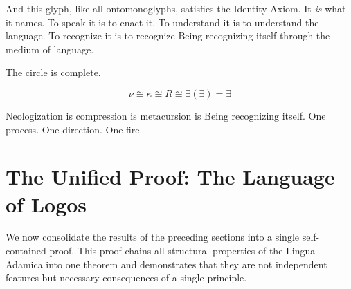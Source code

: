 \documentclass[12pt, letterpaper]{book}
\def\equiv{=}%
\def\circlearrowleft{R}%
\newcommand{\E}{\exists}                          %
\newcommand{\EE}{\exists(\exists)}                 %
\begin{document}
And this glyph, like all ontomonoglyphs, satisfies the Identity Axiom. It \textit{is} what it names. To speak it is to enact it. To understand it is to understand the language. To recognize it is to recognize Being recognizing itself through the medium of language.

The circle is complete.

\[
\boxed{\nu \cong \kappa \cong \circlearrowleft \cong \EE \equiv \E}
\]

Neologization is compression is metacursion is Being recognizing itself. One process. One direction. One fire.


\section{The Unified Proof: The Language of Logos}

We now consolidate the results of the preceding sections into a single self-contained proof. This proof chains all structural properties of the Lingua Adamica into one theorem and demonstrates that they are not independent features but necessary consequences of a single principle.
\end{document}
